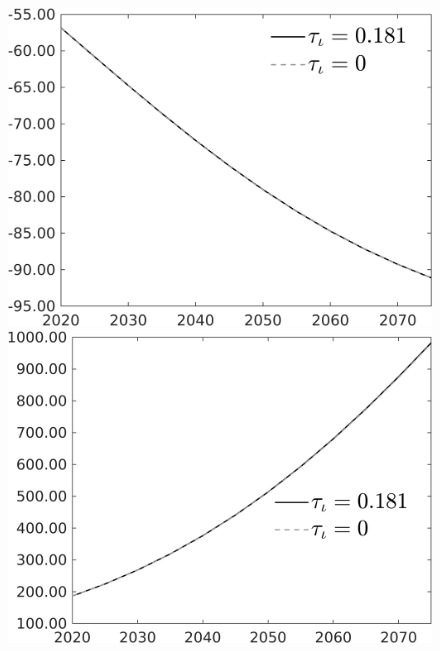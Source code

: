 \documentclass[12pt]{article}
\begin{document}
\begin{figure}[h!!]
\begin{minipage}[]{0.32\textwidth}
\end{minipage}	\begin{minipage}[]{0.32\textwidth}
	\includegraphics[width=1\textwidth]{../../codding_model/own_basedOnFried/optimalPol_010922_revision/figures/all_13Sept22/PerdifNoTauf_Equlab_regime0_CompTaul_wsf_spillover0_nsk0_xgr1_knspil1_sep1_LFlimit0_emsbase0_countec0_GovRev0_etaa0.79_lgd1.png}
\end{minipage}	\begin{minipage}[]{0.32\textwidth}
	\includegraphics[width=1\textwidth]{../../codding_model/own_basedOnFried/optimalPol_010922_revision/figures/all_13Sept22/PerdifNoTauf_Equlab_regime0_CompTaul_wsg_spillover0_nsk0_xgr1_knspil1_sep1_LFlimit0_emsbase0_countec0_GovRev0_etaa0.79_lgd1.png}
\end{minipage}
\end{figure}
\clearpage \newpage
\end{document}
